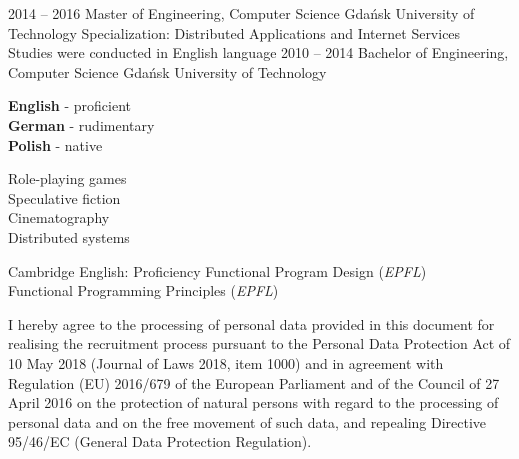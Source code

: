 \documentclass[9pt]{style/developercv}
\begin{document}

\begin{entrylist}
	\entry
		{2014 -- 2016}
		{Master of Engineering, Computer Science}
		{Gdańsk University of Technology}
		{
			Specialization: Distributed Applications and Internet Services \\
			Studies were conducted in English language
		}
	\entry
		{2010 -- 2014}
		{Bachelor of Engineering, Computer Science}
		{Gdańsk University of Technology}
		{}
\end{entrylist}


\begin{minipage}[t]{0.3\textwidth}
	\vspace{-\baselineskip}


	\textbf{English} - proficient\\
	\textbf{German} - rudimentary\\
	\textbf{Polish} - native
\end{minipage}
\hfill
\begin{minipage}[t]{0.3\textwidth}
	\vspace{-\baselineskip}
	
	
	Role-playing games\\
	Speculative fiction\\
	Cinematography\\
	Distributed systems
\end{minipage}
\hfill
\begin{minipage}[t]{0.3\textwidth}
	\vspace{-\baselineskip}
	
	
	Cambridge English: Proficiency
	Functional Program Design (\textit{EPFL})\\
	Functional Programming Principles (\textit{EPFL})
\end{minipage}


\vspace{1.00cm}

\begin{minipage}[t]{1\textwidth}
	\footnotesize{I hereby agree to the processing of personal data provided in this document for 
	realising the recruitment process pursuant to the Personal Data Protection Act
	of 10 May 2018 (Journal of Laws 2018, item 1000) and in agreement with Regulation (EU) 
	2016/679 of the European Parliament and of the Council of 27 April 2016 on the 
	protection of natural persons with regard to the processing of personal data and on 
	the free movement of such data, and repealing Directive 95/46/EC (General Data 
	Protection Regulation).}
\end{minipage}
\end{document}
